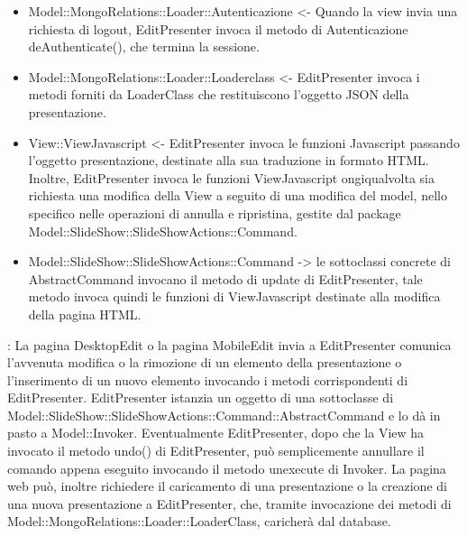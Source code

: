 {{\begin{itemize}
			\item Model::MongoRelations::Loader::Autenticazione <- Quando la view invia una richiesta di logout, EditPresenter invoca il metodo di Autenticazione deAuthenticate(), che termina la sessione.
			\item Model::MongoRelations::Loader::Loaderclass <- EditPresenter invoca i metodi forniti da LoaderClass che restituiscono l'oggetto JSON della presentazione. 
			\item View::ViewJavascript <- EditPresenter invoca le funzioni Javascript passando l'oggetto presentazione, destinate alla sua traduzione in formato HTML. Inoltre, EditPresenter invoca le funzioni ViewJavascript ongiqualvolta sia richiesta una modifica della View a seguito di una modifica del model, nello specifico nelle operazioni di annulla e ripristina, gestite dal package Model::SlideShow::SlideShowActions::Command.
			\item Model::SlideShow::SlideShowActions::Command -> le sottoclassi concrete di AbstractCommand invocano il metodo di update di EditPresenter, tale metodo invoca quindi le funzioni di ViewJavascript destinate alla modifica della pagina HTML.
		\end{itemize} 
		\textbf{\interfacce}: La pagina DesktopEdit o la pagina MobileEdit invia a EditPresenter comunica l’avvenuta modifica o la rimozione di un elemento della presentazione o l’inserimento di un nuovo elemento invocando i metodi corrispondenti di EditPresenter. EditPresenter istanzia un oggetto di una sottoclasse di Model::SlideShow::SlideShowActions::Command::AbstractCommand e lo dà in pasto a Model::Invoker. Eventualmente EditPresenter, dopo che la View ha invocato il metodo undo() di EditPresenter, può semplicemente annullare il comando appena eseguito invocando il metodo unexecute di Invoker.
		La pagina web può, inoltre richiedere il caricamento di una presentazione o la creazione di una nuova presentazione a EditPresenter, che, tramite invocazione dei metodi di Model::MongoRelations::Loader::LoaderClass, caricherà dal database.
		\\
	}
}
